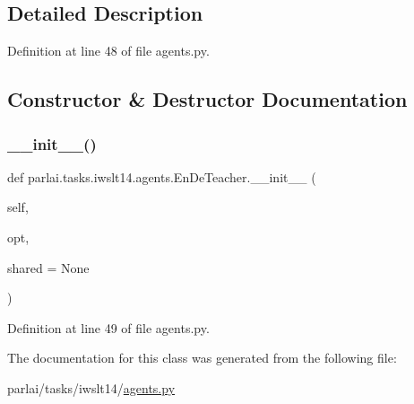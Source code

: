 \subsection{Detailed Description}


Definition at line 48 of file agents.\+py.



\subsection{Constructor \& Destructor Documentation}
\mbox{\label{classparlai_1_1tasks_1_1iwslt14_1_1agents_1_1EnDeTeacher_a1f914b4b0d6966897f2addccd6001acc}} 
\subsubsection{\texorpdfstring{\+\_\+\+\_\+init\+\_\+\+\_\+()}{\_\_init\_\_()}}
{\footnotesize\ttfamily def parlai.\+tasks.\+iwslt14.\+agents.\+En\+De\+Teacher.\+\_\+\+\_\+init\+\_\+\+\_\+ (\begin{DoxyParamCaption}\item[{}]{self,  }\item[{}]{opt,  }\item[{}]{shared = {\ttfamily None} }\end{DoxyParamCaption})}



Definition at line 49 of file agents.\+py.



The documentation for this class was generated from the following file\+:\begin{DoxyCompactItemize}
\item 
parlai/tasks/iwslt14/\hyperlink{parlai_2tasks_2iwslt14_2agents_8py}{agents.\+py}\end{DoxyCompactItemize}
